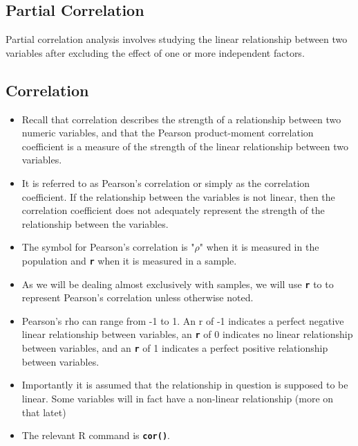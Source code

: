 \subsection{Partial Correlation}
Partial correlation analysis involves studying the linear relationship between two variables after excluding the effect of one or more independent factors.

\newpage
\newpage
\subsection{Correlation}
\begin{itemize}
\item Recall that correlation describes the strength of a relationship between two numeric variables, and that the Pearson product-moment correlation coefficient is a measure of the strength of the linear relationship between two variables.

\item It is referred to as Pearson's correlation or simply as the correlation coefficient. If the relationship between the variables is not linear, then the correlation coefficient does not adequately represent the strength of the relationship between the variables.

\item The symbol for Pearson's correlation is "$\rho$" when it is measured in the population and \texttt{\textbf{r}} when it is measured in a sample.

\item As we will be dealing almost exclusively with samples, we will use \texttt{\textbf{r}} to to represent Pearson's correlation unless otherwise noted.

\item 
Pearson's rho can range from -1 to 1. An r of -1 indicates a perfect negative linear relationship between variables, an \texttt{\textbf{r}} of 0 indicates no linear relationship between variables, and an \texttt{\textbf{r}} of 1 indicates a perfect positive relationship between variables.

\item Importantly it is assumed that the relationship in question is supposed to be linear. Some variables will in fact have a non-linear relationship (more on that latet)
\item 
The relevant R command is \texttt{\textbf{cor()}}.
\end{itemize}

